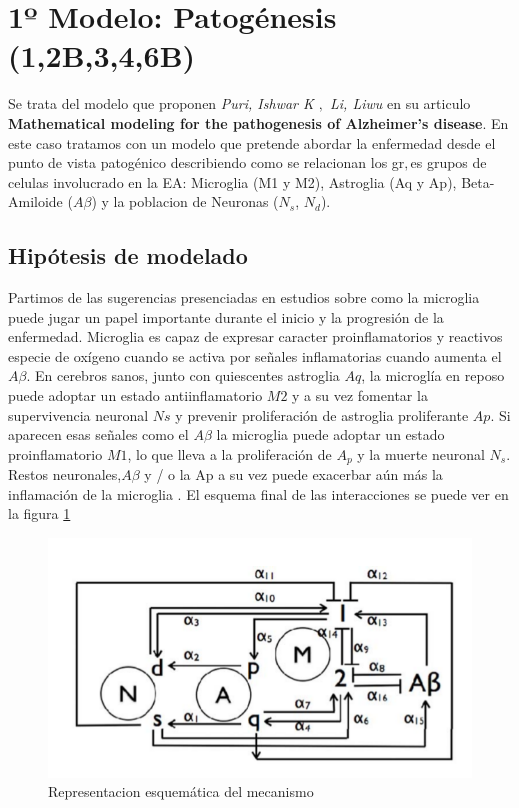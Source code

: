 \documentclass[1p]{elsarticle}
\begin{document}
\section{1º Modelo: Patogénesis (1,2B,3,4,6B)}
Se trata del modelo que proponen \textit{Puri, Ishwar K $,$ Li, Liwu} en su articulo \textbf{Mathematical modeling for the pathogenesis of Alzheimer's disease}\cite{puri}. En este caso tratamos con un modelo que pretende abordar la enfermedad desde el punto de vista patogénico describiendo como se relacionan los gr$,$es grupos de celulas involucrado en la EA: Microglia (M1 y M2), Astroglia (Aq y Ap), Beta-Amiloide ($A\beta$) y la poblacion de Neuronas ($N_s$, $N_d$).


\subsection{Hipótesis de modelado} Partimos de las sugerencias presenciadas en estudios sobre como la microglia puede jugar un papel importante
durante el inicio y la progresión de la enfermedad. Microglia
es capaz de expresar caracter proinflamatorios y reactivos
especie de oxígeno cuando se activa por señales inflamatorias cuando aumenta el $A\beta$. En cerebros sanos, junto con quiescentes astroglia $Aq$, la microglía en reposo puede adoptar un estado antiinflamatorio  $M2$ y a su vez fomentar la supervivencia neuronal $Ns$ y prevenir
proliferación de astroglia proliferante $Ap$. Si aparecen esas señales como el $A\beta$ la microglia puede adoptar un estado proinflamatorio $M1$, lo que lleva a la proliferación de $A_p$ y la muerte neuronal $N_s$. Restos neuronales,$A\beta$ y / o la Ap a su vez puede exacerbar aún más la inflamación
de la microglia . El esquema final de las interacciones se puede ver en la figura \ref{cerebro12}

\begin{figure}
	\begin{center}
	\includegraphics[scale=0.5]{primerdiagrama1.png}
	\caption{Representacion esquemática del mecanismo}
	\label{cerebro12}
		\end{center}
\end{figure}
\end{document}
